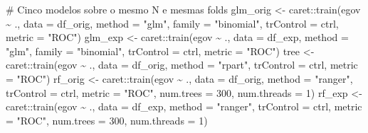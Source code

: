 \documentclass[
  man,
  floatsintext,
  longtable,
  a4paper,
  nolmodern,
  notxfonts,
  notimes,
  colorlinks=true,linkcolor=blue,citecolor=blue,urlcolor=blue]{apa7}
\newenvironment{Shaded}{\begin{snugshade}}{\end{snugshade}}
\newcommand{\AttributeTok}[1]{\textcolor[rgb]{0.40,0.45,0.13}{#1}}
\newcommand{\CommentTok}[1]{\textcolor[rgb]{0.37,0.37,0.37}{#1}}
\newcommand{\DecValTok}[1]{\textcolor[rgb]{0.68,0.00,0.00}{#1}}
\newcommand{\FunctionTok}[1]{\textcolor[rgb]{0.28,0.35,0.67}{#1}}
\newcommand{\NormalTok}[1]{\textcolor[rgb]{0.00,0.23,0.31}{#1}}
\newcommand{\OtherTok}[1]{\textcolor[rgb]{0.00,0.23,0.31}{#1}}
\newcommand{\SpecialCharTok}[1]{\textcolor[rgb]{0.37,0.37,0.37}{#1}}
\newcommand{\StringTok}[1]{\textcolor[rgb]{0.13,0.47,0.30}{#1}}
\begin{document}
\begin{codelisting}
\begin{Shaded}
\begin{Highlighting}[]
\CommentTok{\# Cinco modelos sobre o mesmo N e mesmas folds}
\NormalTok{glm\_orig }\OtherTok{\textless{}{-}}\NormalTok{ caret}\SpecialCharTok{::}\FunctionTok{train}\NormalTok{(egov }\SpecialCharTok{\textasciitilde{}}\NormalTok{ ., }\AttributeTok{data =}\NormalTok{ df\_orig, }\AttributeTok{method =} \StringTok{"glm"}\NormalTok{,}
                         \AttributeTok{family =} \StringTok{"binomial"}\NormalTok{, }\AttributeTok{trControl =}\NormalTok{ ctrl, }\AttributeTok{metric =} \StringTok{"ROC"}\NormalTok{)}
\NormalTok{glm\_exp  }\OtherTok{\textless{}{-}}\NormalTok{ caret}\SpecialCharTok{::}\FunctionTok{train}\NormalTok{(egov }\SpecialCharTok{\textasciitilde{}}\NormalTok{ ., }\AttributeTok{data =}\NormalTok{ df\_exp,  }\AttributeTok{method =} \StringTok{"glm"}\NormalTok{,}
                         \AttributeTok{family =} \StringTok{"binomial"}\NormalTok{, }\AttributeTok{trControl =}\NormalTok{ ctrl, }\AttributeTok{metric =} \StringTok{"ROC"}\NormalTok{)}
\NormalTok{tree     }\OtherTok{\textless{}{-}}\NormalTok{ caret}\SpecialCharTok{::}\FunctionTok{train}\NormalTok{(egov }\SpecialCharTok{\textasciitilde{}}\NormalTok{ ., }\AttributeTok{data =}\NormalTok{ df\_orig, }\AttributeTok{method =} \StringTok{"rpart"}\NormalTok{,}
                         \AttributeTok{trControl =}\NormalTok{ ctrl, }\AttributeTok{metric =} \StringTok{"ROC"}\NormalTok{)}
\NormalTok{rf\_orig  }\OtherTok{\textless{}{-}}\NormalTok{ caret}\SpecialCharTok{::}\FunctionTok{train}\NormalTok{(egov }\SpecialCharTok{\textasciitilde{}}\NormalTok{ ., }\AttributeTok{data =}\NormalTok{ df\_orig, }\AttributeTok{method =} \StringTok{"ranger"}\NormalTok{,}
                         \AttributeTok{trControl =}\NormalTok{ ctrl, }\AttributeTok{metric =} \StringTok{"ROC"}\NormalTok{,}
                         \AttributeTok{num.trees =} \DecValTok{300}\NormalTok{, }\AttributeTok{num.threads =} \DecValTok{1}\NormalTok{)}
\NormalTok{rf\_exp   }\OtherTok{\textless{}{-}}\NormalTok{ caret}\SpecialCharTok{::}\FunctionTok{train}\NormalTok{(egov }\SpecialCharTok{\textasciitilde{}}\NormalTok{ ., }\AttributeTok{data =}\NormalTok{ df\_exp,  }\AttributeTok{method =} \StringTok{"ranger"}\NormalTok{,}
                         \AttributeTok{trControl =}\NormalTok{ ctrl, }\AttributeTok{metric =} \StringTok{"ROC"}\NormalTok{,}
                         \AttributeTok{num.trees =} \DecValTok{300}\NormalTok{, }\AttributeTok{num.threads =} \DecValTok{1}\NormalTok{)}
\end{Highlighting}
\end{Shaded}

\end{codelisting}
\end{document}

